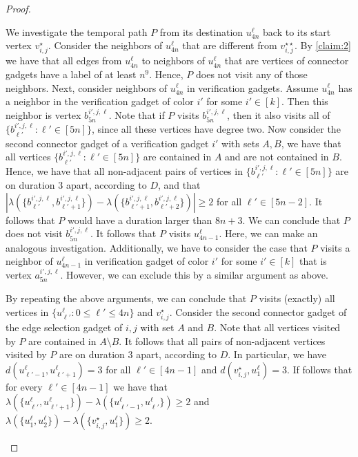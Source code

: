 \documentclass[a4paper,UKenglish,cleveref, autoref, thm-restate]{lipics-v2021}
\begin{document}
\begin{proof}
\begin{claimproof}
    We investigate the temporal path $P$ from its destination $u^\ell_{4n}$ back to its start vertex $v_{i,j}^\star$. Consider the neighbors of $u^\ell_{4n}$ that are different from $v_{i,j}^{\star\star}$. By \cref{claim:2} we have that all edges from $u^\ell_{4n}$ to neighbors of $u^\ell_{4n}$ that are vertices of connector gadgets have a label of at least $n^9$. Hence, $P$ does not visit any of those neighbors. Next, consider neighbors of $u^\ell_{4n}$ in verification gadgets. Assume $u^\ell_{4n}$ has a neighbor in the verification gadget of color $i'$ for some $i'\in[k]$. Then this neighbor is vertex $b^{i',j,\ell}_{5n}$. Note that if $P$ visits $b^{i',j,\ell}_{5n}$, then it also visits all of $\{b^{i',j,\ell}_{\ell'} :  \ell'\in[5n]\}$, since all these vertices have degree two. 
   Now consider the second connector gadget of a verification gadget $i'$ with sets $A,B$, we have that all vertices $\{b^{i',j,\ell}_{\ell'} :  \ell'\in[5n]\}$ are contained in $A$ and are not contained in $B$. Hence, we have that all non-adjacent pairs of vertices in $\{b^{i',j,\ell}_{\ell'} :  \ell'\in[5n]\}$ are on duration $3$ apart, according to $D$, and that $|\lambda(\{b^{i',j,\ell}_{\ell'},b^{i',j,\ell}_{\ell'+1}\})-\lambda(\{b^{i',j,\ell}_{\ell'+1},b^{i',j,\ell}_{\ell'+2}\})|\ge 2$ for all $\ell'\in[5n-2]$.  
    It follows that $P$ would have a duration larger than $8n+3$. We can conclude that $P$ does not visit $b^{i',j,\ell}_{5n}$. It follows that $P$ visits $u^\ell_{4n-1}$.
    Here, we can make an analogous investigation. Additionally, we have to consider the case that $P$ visits a neighbor of $u^\ell_{4n-1}$ in verification gadget of color $i'$ for some $i'\in[k]$ that is vertex $a^{i',j,\ell}_{5n}$. However, we can exclude this by a similar argument as above. 

    By repeating the above arguments, we can conclude that $P$ visits (exactly) all vertices in $\{u^\ell_{\ell'} :  0\le \ell'\le 4n\}$ and $v_{i,j}^\star$.
    Consider the second connector gadget of the edge selection gadget of $i,j$ with set $A$ and $B$. Note that all vertices visited by $P$ are contained in $A\setminus B$. It follows that all pairs of non-adjacent vertices visited by $P$ are on duration $3$ apart, according to $D$. In particular, we have $d(u^\ell_{\ell'-1},u^\ell_{\ell'+1})=3$ for all $\ell'\in[4n-1]$ and $d(v_{i,j}^\star,u^\ell_{1})=3$. If follows that for every $\ell'\in[4n-1]$ we have that $\lambda(\{u^\ell_{\ell'},u^\ell_{\ell'+1}\})-\lambda(\{u^\ell_{\ell'-1},u^\ell_{\ell'}\})\ge 2$ and $\lambda(\{u^\ell_{1},u^\ell_{2}\})-\lambda(\{v_{i,j}^\star,u^\ell_{1}\})\ge 2$. 


\end{claimproof}
\end{proof}
\end{document}
